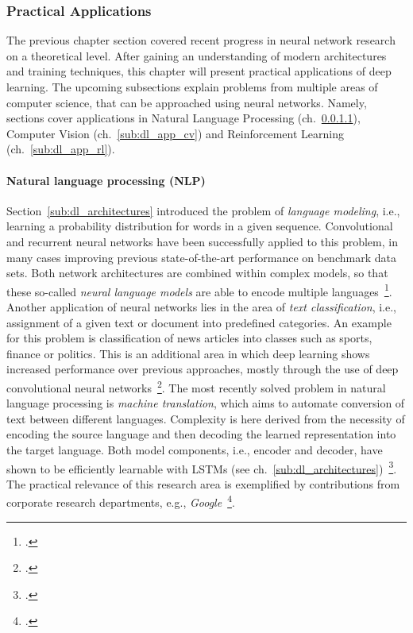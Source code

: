 \subsubsection{Practical Applications}
\label{sub:dl_applications}

The previous chapter section covered recent progress in neural network research
on a theoretical level.
After gaining an understanding of modern architectures and training techniques,
this chapter will present practical applications of deep learning.
The upcoming subsections explain problems from multiple areas of computer
science, that can be approached using neural networks.
Namely, sections cover applications in Natural Language Processing (ch.~\ref{sub:dl_app_nlp}),
Computer Vision (ch.~\ref{sub:dl_app_cv}) and Reinforcement Learning (ch.~\ref{sub:dl_app_rl}).

\paragraph{Natural language processing (NLP)}
\label{sub:dl_app_nlp}

Section~\ref{sub:dl_architectures} introduced the problem of \textit{language modeling},
i.e., learning a probability distribution for words in a given sequence.
Convolutional and recurrent neural networks have been successfully applied to
this problem, in many cases improving previous state-of-the-art performance
on benchmark data sets.
Both network architectures are combined within complex models, so that these
so-called \textit{neural language models} are able to encode multiple
languages~\footcite{Kim2015}.
Another application of neural networks lies in the area of \textit{text classification},
i.e., assignment of a given text or document into predefined categories.
An example for this problem is classification of news articles into classes such
as sports, finance or politics.
This is an additional area in which deep learning shows increased performance
over previous approaches, mostly through the use of deep convolutional neural
networks~\footcite{Conneau2016}.
The most recently solved problem in natural language processing is \textit{machine
translation}, which aims to automate conversion of text between different
languages.
Complexity is here derived from the necessity of encoding the source language and
then decoding the learned representation into the target language.
Both model components, i.e., encoder and decoder, have shown to be efficiently
learnable with LSTMs (see ch.~\ref{sub:dl_architectures})~\footcite{Sutskever2014}.
The practical relevance of this research area is exemplified by contributions
from corporate research departments, e.g., \textit{Google}~\footcite{Wu2016}.

